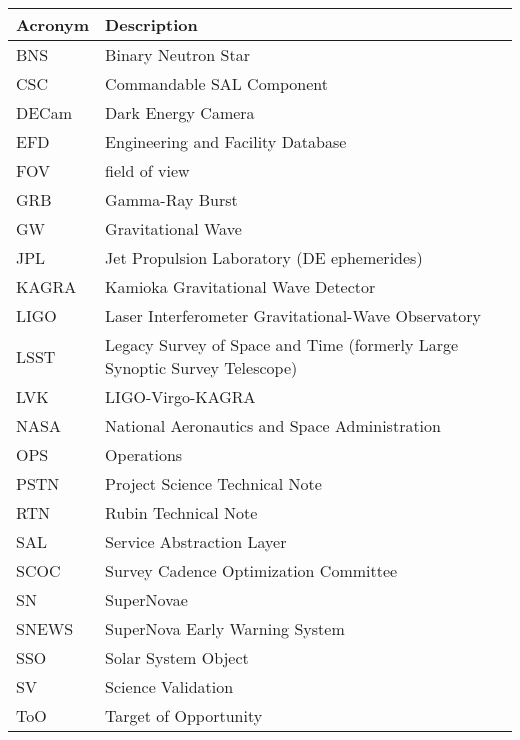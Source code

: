 \addtocounter{table}{-1}
\begin{longtable}{p{}p{}}\hline
\textbf{Acronym} & \textbf{Description}  \\\hline

BNS & Binary Neutron Star \\\hline
CSC & Commandable SAL Component \\\hline
DECam & Dark Energy Camera \\\hline
EFD & Engineering and Facility Database \\\hline
FOV & field of view \\\hline
GRB & Gamma-Ray Burst \\\hline
GW & Gravitational Wave \\\hline
JPL & Jet Propulsion Laboratory (DE ephemerides) \\\hline
KAGRA & Kamioka Gravitational Wave Detector \\\hline
LIGO & Laser Interferometer Gravitational-Wave Observatory \\\hline
LSST & Legacy Survey of Space and Time (formerly Large Synoptic Survey Telescope) \\\hline
LVK & LIGO-Virgo-KAGRA \\\hline
NASA & National Aeronautics and Space Administration \\\hline
OPS & Operations \\\hline
PSTN & Project Science Technical Note \\\hline
RTN & Rubin Technical Note \\\hline
SAL & Service Abstraction Layer \\\hline
SCOC & Survey Cadence Optimization Committee \\\hline
SN & SuperNovae \\\hline
SNEWS & SuperNova Early Warning System \\\hline
SSO & Solar System Object \\\hline
SV & Science Validation \\\hline
ToO & Target of Opportunity \\\hline
\end{longtable}
